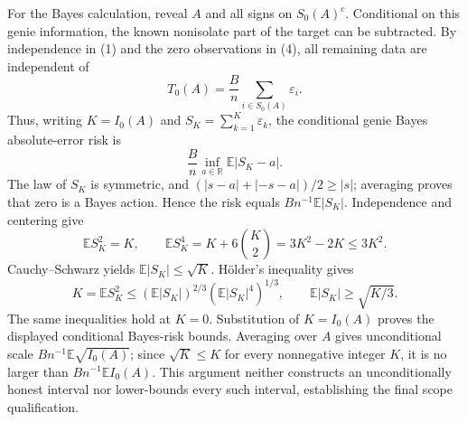 For the Bayes calculation, reveal \(A\) and all signs on \(S_0(A)^c\).  Conditional on this genie information, the known nonisolate part of the target can be subtracted.  By independence in (1) and the zero observations in (4), all remaining data are independent of
\[
 T_0(A)=\frac Bn\sum_{i\in S_0(A)}\varepsilon_i.
\tag{6}
\]
Thus, writing \(K=I_0(A)\) and \(S_K=\sum_{k=1}^K\varepsilon_k\), the conditional genie Bayes absolute-error risk is
\[
 \frac Bn\inf_{a\in\mathbb R}\mathbb E|S_K-a|.
\]
The law of \(S_K\) is symmetric, and \((|s-a|+|-s-a|)/2\geq|s|\); averaging proves that zero is a Bayes action.  Hence the risk equals \(Bn^{-1}\mathbb E|S_K|\).  Independence and centering give
\[
 \mathbb ES_K^2=K,
 \qquad \mathbb ES_K^4=K+6{K\choose2}=3K^2-2K\leq3K^2.
\tag{7}
\]
Cauchy--Schwarz yields \(\mathbb E|S_K|\leq\sqrt K\).  H\"older's inequality gives
\[
 K=\mathbb ES_K^2
 \leq(\mathbb E|S_K|)^{2/3}(\mathbb E|S_K|^4)^{1/3},
 \qquad \mathbb E|S_K|\geq\sqrt{K/3}.
\tag{8}
\]
The same inequalities hold at \(K=0\).  Substitution of \(K=I_0(A)\) proves the displayed conditional Bayes-risk bounds.  Averaging over \(A\) gives unconditional scale \(Bn^{-1}\mathbb E\sqrt{I_0(A)}\); since \(\sqrt K\leq K\) for every nonnegative integer \(K\), it is no larger than \(Bn^{-1}\mathbb EI_0(A)\).  This argument neither constructs an unconditionally honest interval nor lower-bounds every such interval, establishing the final scope qualification.